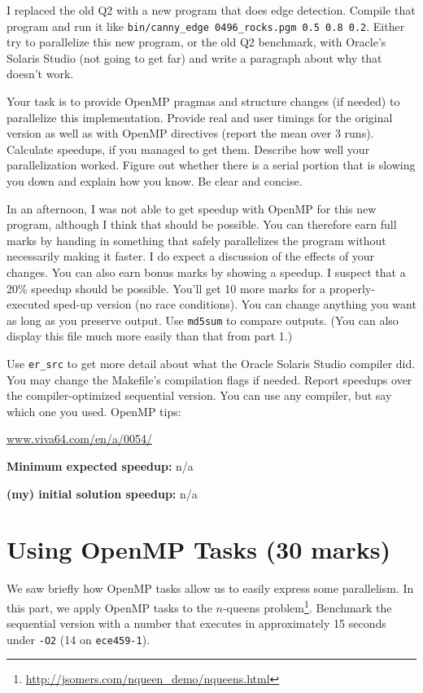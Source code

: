 \documentclass[letterpaper,10pt]{article}
\begin{document}
I replaced the old Q2 with a new program that does edge detection.
Compile that program and run it like {\tt bin/canny\_edge
  0496\_rocks.pgm 0.5 0.8 0.2}.  Either try to parallelize this new
program, or the old Q2 benchmark, with Oracle's Solaris Studio (not
going to get far) and write a paragraph about why that doesn't work.

Your task is to provide OpenMP pragmas and structure changes (if
needed) to parallelize this implementation. Provide real and user
timings for the original version as well as with OpenMP directives
(report the mean over 3 runs).  Calculate speedups, if you managed to
get them. Describe how well your parallelization worked. Figure out
whether there is a serial portion that is slowing you down and explain
how you know. Be clear and concise.

In an afternoon, I was not able to get speedup with OpenMP for this
new program, although I think that should be possible. You can
therefore earn full marks by handing in something that safely
parallelizes the program without necessarily making it faster. I do
expect a discussion of the effects of your changes. You can also earn
bonus marks by showing a speedup.  I suspect that a 20\% speedup
should be possible. You'll get 10 more marks for a properly-executed
sped-up version (no race conditions). You can change anything you want
as long as you preserve output. Use {\tt md5sum} to compare
outputs. (You can also display this file much more easily than that
from part 1.)

\vspace*{1em}
 Use {\tt er\_src} to get more detail about what the Oracle
Solaris Studio compiler did.  You may change the
Makefile's compilation flags if needed. Report speedups over the
compiler-optimized sequential version.  You can use any compiler, but
say which one you used. OpenMP tips:
\begin{center}
  \url{www.viva64.com/en/a/0054/}
\end{center}

\squishlist
  \item {\bf Minimum expected speedup:} n/a
  \item {\bf (my) initial solution speedup:} n/a
\squishend

\section*{Using OpenMP Tasks (30 marks)}

We saw briefly how OpenMP tasks allow us to easily express some parallelism.
In this part, we apply OpenMP tasks to the $n$-queens
problem\footnote{\url{http://jsomers.com/nqueen_demo/nqueens.html}}.
Benchmark the sequential version with a number that executes in approximately
15 seconds under {\tt -O2} (14 on {\tt ece459-1}).
\end{document}
